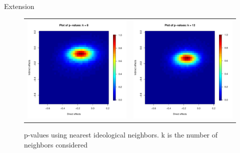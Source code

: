 \documentclass[final]{beamer}
\newlength{\onecolwid}
\newlength{\onecolwidd}
\begin{document}
\begin{frame}[t]
\begin{columns}[t]
\begin{column}{\onecolwidd}
\begin{block}{Extension}
\begin{rmfamily}
\begin{figure}
\begin{tabular}{cc}
	\includegraphics[scale=0.8]{pvalues_figure_8nn.pdf} &
	\includegraphics[scale=0.8]{pvalues_figure_12nn.pdf} \\ 
	\end{tabular}
	\caption{p-values using nearest ideological neighbors. k is the number of neighbors considered}
	\end{figure}
	

\end{rmfamily}
\end{block}
\end{column}
\end{columns}
\end{frame}
\end{document}
